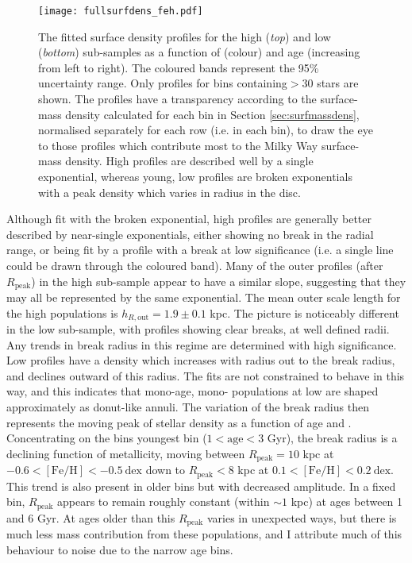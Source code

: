 \begin{landscape}
\begin{figure}
\texttt{[image: fullsurfdens\_feh.pdf]}
      \centering
     \caption[Surface density profiles of mono-age, mono-\feh{} populations in the low and high \afe{} disc components of the Milky Way]{The fitted surface density profiles for the high \afe{} (\emph{top}) and low \afe{} (\emph{bottom}) sub-samples as a function of \feh{} (colour) and age (increasing from left to right). The coloured bands represent the 95\% uncertainty range.  Only profiles for bins containing$ > 30$ stars are shown. The profiles have a transparency according to the surface-mass density calculated for each bin in Section \ref{sec:surfmassdens}, normalised separately for each row (i.e. in each \feh{} bin), to draw the eye to those profiles which contribute most to the Milky Way surface-mass density. High \afe{} profiles are described well by a single exponential, whereas young, low \afe{} profiles are broken exponentials with a peak density which varies in radius in the disc.}
     \label{fig:surfdens}
 \end{figure}
\end{landscape}


Although fit with the broken exponential, high \afe{} profiles are generally better described by near-single exponentials, either showing no break in the radial range, or being fit by a profile with a break at low significance (i.e. a single line could be drawn through the coloured band). Many of the outer profiles (after $R_{\mathrm{peak}}$) in the high \afe{} sub-sample appear to have a similar slope, suggesting that they may all be represented by the same exponential. The mean outer scale length for the high \afe{} populations is $h_{R,\text{out}} = 1.9\pm 0.1$ kpc. The picture is noticeably different in the low \afe{} sub-sample, with profiles showing clear breaks, at well defined radii. Any trends in break radius in this regime are determined with high significance. Low \afe{} profiles have a density which increases with radius out to the break radius, and declines outward of this radius. The fits are not constrained to behave in this way, and this indicates that mono-age, mono-\feh{} populations at low \feh{} are shaped approximately as donut-like annuli. The variation of the break radius then represents the moving peak of stellar density as a function of age and \feh{}. Concentrating on the bins youngest bin ($1 < \mathrm{age} < 3$ Gyr), the break radius is a declining function of metallicity, moving between $R_{\mathrm{peak}}=10$ kpc at $-0.6 < \mathrm{[Fe/H]} < -0.5\ \mathrm{dex}$ down to $R_{\mathrm{peak}} < 8$ kpc at $0.1 < \mathrm{[Fe/H]} < 0.2\ \mathrm{dex}$. This trend is also present in older bins but with decreased amplitude. In a fixed \feh{} bin, $R_{\mathrm{peak}}$ appears to remain roughly constant (within $\sim1$ kpc) at ages between 1 and 6 Gyr.  At ages older than this $R_{\mathrm{peak}}$ varies in unexpected ways, but there is much less mass contribution from these populations, and I attribute much of this behaviour to noise due to the narrow age bins. 

